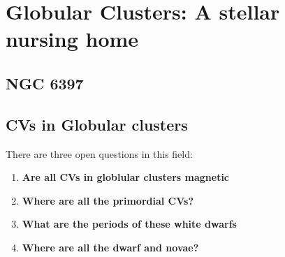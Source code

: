 \section{Globular Clusters: A stellar nursing home}\label{sec:gc}

%

\subsection{NGC 6397}



\subsection{CVs in Globular clusters}\label{sec:cogc}


There are three open questions in this field:

\begin{enumerate}
        \item \textbf{Are all CVs in globlular clusters magnetic}
        \item \textbf{Where are all the primordial CVs?}
        \item \textbf{What are the periods of these white dwarfs}
        \item \textbf{Where are all the dwarf and novae?}
\end{enumerate}


